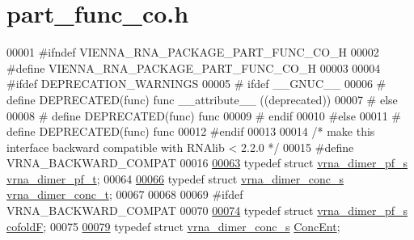 \hypertarget{part__func__co_8h_source}{}\section{part\+\_\+func\+\_\+co.\+h}
\label{part__func__co_8h_source}

\begin{DoxyCode}
00001 \textcolor{preprocessor}{#ifndef VIENNA\_RNA\_PACKAGE\_PART\_FUNC\_CO\_H}
00002 \textcolor{preprocessor}{#define VIENNA\_RNA\_PACKAGE\_PART\_FUNC\_CO\_H}
00003 
00004 \textcolor{preprocessor}{#ifdef DEPRECATION\_WARNINGS}
00005 \textcolor{preprocessor}{# ifdef \_\_GNUC\_\_}
00006 \textcolor{preprocessor}{#  define DEPRECATED(func) func \_\_attribute\_\_ ((deprecated))}
00007 \textcolor{preprocessor}{# else}
00008 \textcolor{preprocessor}{#  define DEPRECATED(func) func}
00009 \textcolor{preprocessor}{# endif}
00010 \textcolor{preprocessor}{#else}
00011 \textcolor{preprocessor}{# define DEPRECATED(func) func}
00012 \textcolor{preprocessor}{#endif}
00013 
00014 \textcolor{comment}{/* make this interface backward compatible with RNAlib < 2.2.0 */}
00015 \textcolor{preprocessor}{#define VRNA\_BACKWARD\_COMPAT}
00016 
\hypertarget{part__func__co_8h_source.tex_l00063}{}\hyperlink{group__pf__cofold_ga444df1587c9a2ca15b8eb25188f629c3}{00063} \textcolor{keyword}{typedef} \textcolor{keyword}{struct }\hyperlink{group__pf__cofold_structvrna__dimer__pf__s}{vrna\_dimer\_pf\_s}  \hyperlink{group__pf__cofold_structvrna__dimer__pf__s}{vrna\_dimer\_pf\_t};
00064 
\hypertarget{part__func__co_8h_source.tex_l00066}{}\hyperlink{group__pf__cofold_gac48c2723444ecfdceafcfd525ca98322}{00066} \textcolor{keyword}{typedef} \textcolor{keyword}{struct }\hyperlink{group__pf__cofold_structvrna__dimer__conc__s}{vrna\_dimer\_conc\_s}  \hyperlink{group__pf__cofold_structvrna__dimer__conc__s}{vrna\_dimer\_conc\_t};
00067 
00068 
00069 \textcolor{preprocessor}{#ifdef VRNA\_BACKWARD\_COMPAT}
00070 
\hypertarget{part__func__co_8h_source.tex_l00074}{}\hyperlink{group__pf__cofold_ga5445d8d96a40e9e79b1fa5a7f1a6b7ea}{00074} \textcolor{keyword}{typedef} \textcolor{keyword}{struct }\hyperlink{group__pf__cofold_structvrna__dimer__pf__s}{vrna\_dimer\_pf\_s}    \hyperlink{group__pf__cofold_structvrna__dimer__pf__s}{cofoldF};
00075 
\hypertarget{part__func__co_8h_source.tex_l00079}{}\hyperlink{group__pf__cofold_ga46244c7adf5040580291c45b465f4efa}{00079} \textcolor{keyword}{typedef} \textcolor{keyword}{struct }\hyperlink{group__pf__cofold_structvrna__dimer__conc__s}{vrna\_dimer\_conc\_s}  \hyperlink{group__pf__cofold_structvrna__dimer__conc__s}{ConcEnt};

\end{DoxyCode}
